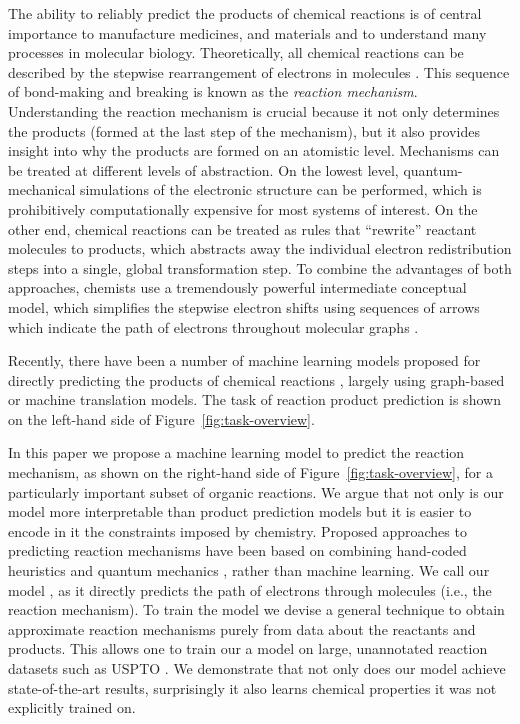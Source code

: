
The ability to reliably predict the products of chemical reactions is of central importance to manufacture medicines, and materials and to understand many processes in molecular biology.
Theoretically, all chemical reactions can be described by the stepwise rearrangement of electrons in molecules \cite{herges1994organizing}. 
This sequence of bond-making and breaking is known as the \emph{reaction mechanism}. 
Understanding the reaction mechanism is crucial because it not only determines the products (formed at the last step of the mechanism), 
but it also provides insight into why the products are formed on an atomistic level. 
%
Mechanisms can be treated at different levels of abstraction. 
On the lowest level, quantum-mechanical simulations of the electronic structure can be performed, which is prohibitively computationally expensive for most systems of interest. 
On the other end, chemical reactions can be treated as rules that ``rewrite'' reactant molecules to products, which abstracts away the individual electron redistribution steps into a single, global transformation step. 
To combine the advantages of both approaches, chemists use a tremendously powerful intermediate conceptual model, which simplifies the stepwise electron shifts using sequences of arrows which indicate the path of electrons throughout molecular graphs \cite{herges1994organizing}. 

Recently, there have been a number of machine learning models proposed for directly predicting the products of chemical reactions \cite{coley2017prediction,jin2017predicting,schwaller2017found,neural-symbolic,segler2018planning,wei2016neural}, largely using graph-based or machine translation models. 
The task of reaction product prediction is shown on the left-hand side of Figure~\ref{fig:task-overview}. 

In this paper we propose a machine learning model to predict the reaction mechanism, as shown on the right-hand side of Figure~\ref{fig:task-overview}, for a particularly important subset of organic reactions.
We argue that not only is our model more interpretable than product prediction models but it is easier to encode in it the constraints imposed by chemistry. 
Proposed approaches to predicting reaction mechanisms have been based on combining hand-coded heuristics and quantum mechanics \cite{bergeler2015heuristics,kim2018efficient,nandi2017tabu,rappoport2014complex,simm2017context,zimmerman2013automated}, 
rather than machine learning.
We call our model \ourModel, as it directly predicts the path of electrons through molecules (i.e., the reaction mechanism). 
To train the model we devise a general technique to obtain approximate reaction mechanisms purely from data about the reactants and products. 
This allows one to train our a model on large, unannotated reaction datasets such as USPTO \cite{lowe2012extraction}. We demonstrate that not only does our model achieve state-of-the-art results, surprisingly it also learns chemical properties it was not explicitly trained on.



